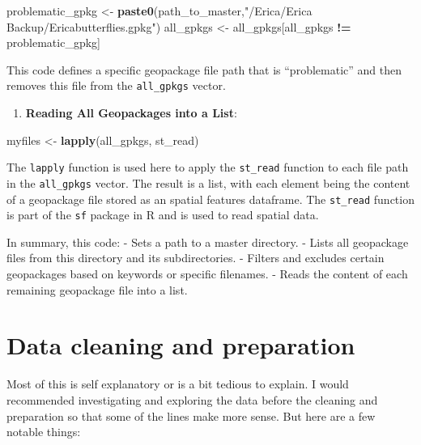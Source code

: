 \documentclass[
]{book}
\newenvironment{Shaded}{\begin{snugshade}}{\end{snugshade}}
\newcommand{\FunctionTok}[1]{\textcolor[rgb]{0.13,0.29,0.53}{\textbf{#1}}}
\newcommand{\NormalTok}[1]{#1}
\newcommand{\OtherTok}[1]{\textcolor[rgb]{0.56,0.35,0.01}{#1}}
\newcommand{\SpecialCharTok}[1]{\textcolor[rgb]{0.81,0.36,0.00}{\textbf{#1}}}
\newcommand{\StringTok}[1]{\textcolor[rgb]{0.31,0.60,0.02}{#1}}
\providecommand{\tightlist}{%
  \setlength{\itemsep}{0pt}\setlength{\parskip}{0pt}}
\begin{document}
\begin{Shaded}
\begin{Highlighting}[]
\NormalTok{   problematic\_gpkg }\OtherTok{\textless{}{-}} \FunctionTok{paste0}\NormalTok{(path\_to\_master,}\StringTok{"/Erica/Erica Backup/Ericabutterflies.gpkg"}\NormalTok{)}
\NormalTok{   all\_gpkgs }\OtherTok{\textless{}{-}}\NormalTok{ all\_gpkgs[all\_gpkgs }\SpecialCharTok{!=}\NormalTok{ problematic\_gpkg]}
\end{Highlighting}
\end{Shaded}

This code defines a specific geopackage file path that is ``problematic'' and then removes this file from the \texttt{all\_gpkgs} vector.

\begin{enumerate}
\def\labelenumi{\arabic{enumi}.}
\setcounter{enumi}{5}
\tightlist
\item
  \textbf{Reading All Geopackages into a List}:
\end{enumerate}

\begin{Shaded}
\begin{Highlighting}[]
\NormalTok{myfiles }\OtherTok{\textless{}{-}} \FunctionTok{lapply}\NormalTok{(all\_gpkgs, st\_read)}
\end{Highlighting}
\end{Shaded}

The \texttt{lapply} function is used here to apply the \texttt{st\_read} function to each file path in the \texttt{all\_gpkgs} vector. The result is a list, with each element being the content of a geopackage file stored as an spatial features dataframe. The \texttt{st\_read} function is part of the \texttt{sf} package in R and is used to read spatial data.

In summary, this code:
- Sets a path to a master directory.
- Lists all geopackage files from this directory and its subdirectories.
- Filters and excludes certain geopackages based on keywords or specific filenames.
- Reads the content of each remaining geopackage file into a list.

\hypertarget{data-cleaning-and-preparation}{%
\section{Data cleaning and preparation}\label{data-cleaning-and-preparation}}

Most of this is self explanatory or is a bit tedious to explain. I would recommended investigating and exploring the data before the cleaning and preparation so that some of the lines make more sense. But here are a few notable things:
\end{document}
